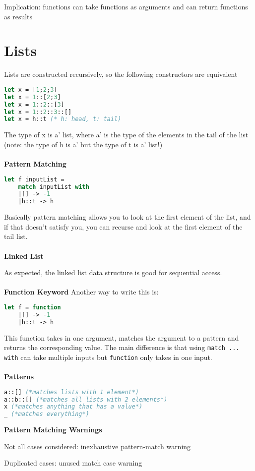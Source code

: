 \documentclass[12pt,a4paper]{article} %
\begin{document}
Implication: functions can take functions as arguments and can return functions as results
\section{Lists}
Lists are constructed recursively, so the following constructors are equivalent
\begin{lstlisting}[language=Caml]
let x = [1;2;3]
let x = 1::[2;3]
let x = 1::2::[3]
let x = 1::2::3::[]
let x = h::t (* h: head, t: tail)
\end{lstlisting}
The type of x is a' list, where a' is the type of the elements in the tail of the list (note: the type of h is a' but the type of t is a' list!)
\\\\
\textbf{Pattern Matching}
\begin{lstlisting}[language=Caml]
let f inputList = 
	match inputList with
	|[] -> -1
	|h::t -> h
\end{lstlisting}
Basically pattern matching allows you to look at the first element of the list, and if that doesn't satisfy you, you can recurse and look at the first element of the tail list.
\\\\
\textbf{Linked List}

As expected, the linked list data structure is good for sequential access.
\\\\
\textbf{Function Keyword}
Another way to write this is:
\begin{lstlisting}[language=Caml]
let f = function
	|[] -> -1
	|h::t -> h
\end{lstlisting}
This function takes in one argument, matches the argument to a pattern and returns the corresponding value. The main difference is that using \verb|match ... with| can take multiple inputs but \verb|function| only takes in one input.
\\\\
\textbf{Patterns}
\begin{lstlisting}[language=Caml]
a::[] (*matches lists with 1 element*)
a::b::[] (*matches all lists with 2 elements*)
x (*matches anything that has a value*)
_ (*matches everything*)
\end{lstlisting}
\textbf{Pattern Matching Warnings}

Not all cases considered: inexhaustive pattern-match warning

Duplicated cases: unused match case warning
\end{document}

